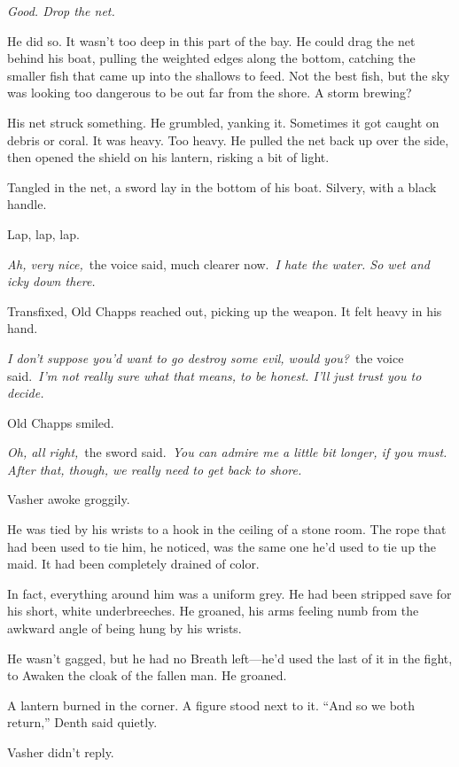 \textit{Good. Drop the net.}

He did so. It wasn’t too deep in this part of the bay. He could drag the net behind his boat, pulling the weighted edges along the bottom, catching the smaller fish that came up into the shallows to feed. Not the best fish, but the sky was looking too dangerous to be out far from the shore. A storm brewing?

His net struck something. He grumbled, yanking it. Sometimes it got caught on debris or coral. It was heavy. Too heavy. He pulled the net back up over the side, then opened the shield on his lantern, risking a bit of light.

Tangled in the net, a sword lay in the bottom of his boat. Silvery, with a black handle.

Lap, lap, lap.

\textit{Ah, very nice,}~the voice said, much clearer now.~\textit{I hate the water. So wet and icky down there.}

Transfixed, Old Chapps reached out, picking up the weapon. It felt heavy in his hand.

\textit{I don’t suppose you’d want to go destroy some evil, would you?}~the voice said.~\textit{I’m not really sure what that means, to be honest. I’ll just trust you to decide.}

Old Chapps smiled.

\textit{Oh, all right,}~the sword said.~\textit{You can admire me a little bit longer, if you must. After that, though, we really need to get back to shore.}

\orn

Vasher awoke groggily.

He was tied by his wrists to a hook in the ceiling of a stone room. The rope that had been used to tie him, he noticed, was the same one he’d used to tie up the maid. It had been completely drained of color.

In fact, everything around him was a uniform grey. He had been stripped save for his short, white underbreeches. He groaned, his arms feeling numb from the awkward angle of being hung by his wrists.

He wasn’t gagged, but he had no Breath left—he’d used the last of it in the fight, to Awaken the cloak of the fallen man. He groaned.

A lantern burned in the corner. A figure stood next to it. “And so we both return,” Denth said quietly.

Vasher didn’t reply.

